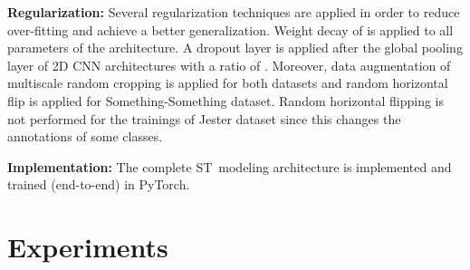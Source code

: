 \documentclass[runningheads]{llncs}
\begin{document}
\textbf{Regularization:} Several regularization techniques are applied in order to reduce over-fitting and achieve a better generalization. Weight decay of  is applied to all parameters of the architecture. A dropout layer is applied after the global pooling layer of 2D CNN architectures with a ratio of . Moreover, data augmentation of multiscale random cropping is applied for both datasets and random horizontal flip is applied for Something-Something dataset. Random horizontal flipping is not performed for the trainings of Jester dataset since this changes the annotations of some classes.  

\textbf{Implementation:} The complete ST~modeling architecture is implemented and trained (end-to-end) in PyTorch. 














































































 \section{Experiments}
\end{document}
